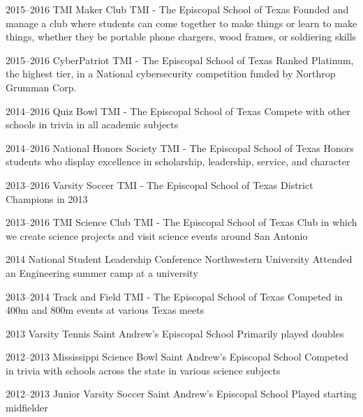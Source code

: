 \documentclass[]{friggeri-cv} %
\begin{document}
\begin{entrylist}

	\entry
	{2015--2016}
	{TMI Maker Club}
	{TMI - The Episcopal School of Texas}
	{Founded and manage a club where students can come together to make things or learn to make things, whether they be portable phone chargers, wood frames, or soldiering skills}


	\entry
	{2015--2016}
	{CyberPatriot}
	{TMI - The Episcopal School of Texas}
	{Ranked Platinum, the highest tier, in a National cybersecurity competition funded by Northrop Grumman Corp.}


	\entry
	{2014--2016}
	{Quiz Bowl}
	{TMI - The Episcopal School of Texas}
	{Compete with other schools in trivia in all academic subjects}


	\entry
	{2014--2016}
	{National Honors Society}
	{TMI - The Episcopal School of Texas}
	{Honors students who display excellence in scholarship, leadership, service, and character}


	\entry
	{2013--2016}
	{Varsity Soccer}
	{TMI - The Episcopal School of Texas}
	{District Champions in 2013}


	\entry
	{2013--2016}
	{TMI Science Club}
	{TMI - The Episcopal School of Texas}
	{Club in which we create science projects and visit science events around San Antonio}


	\entry
	{2014}
	{National Student Leadership Conference}
	{Northwestern University}
	{Attended an Engineering summer camp at a university}


	\entry
	{2013--2014}
	{Track and Field}
	{TMI - The Episcopal School of Texas}
	{Competed in 400m and 800m events at various Texas meets}


	\entry
	{2013}
	{Varsity Tennis}
	{Saint Andrew's Episcopal School}
	{Primarily played doubles}


	\entry
	{2012--2013}
	{Mississippi Science Bowl}
	{Saint Andrew's Episcopal School}
	{Competed in trivia with schools across the state in various science subjects}


	\entry
	{2012--2013}
	{Junior Varsity Soccer}
	{Saint Andrew's Episcopal School}
	{Played starting midfielder}

\end{entrylist}
\end{document}
